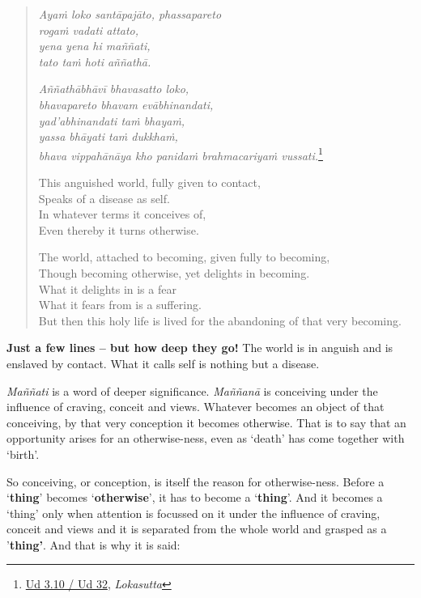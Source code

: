 \enlargethispage{\baselineskip}

\begin{quote}
\emph{Ayaṁ loko santāpajāto, phassapareto}\\
\emph{rogaṁ vadati attato,}\\
\emph{yena yena hi maññati,}\\
\emph{tato taṁ hoti aññathā.}

\emph{Aññathābhāvī bhavasatto loko,}\\
\emph{bhavapareto bhavam evābhinandati,}\\
\emph{yad'abhinandati taṁ bhayaṁ,}\\
\emph{yassa bhāyati taṁ dukkhaṁ,}\\
\emph{bhava vippahānāya kho panidaṁ brahmacariyaṁ vussati.}\footnote{\href{https://suttacentral.net/ud3.10/pli/ms}{Ud 3.10 / Ud 32}, \emph{Lokasutta}}

This anguished world, fully given to contact,\\
Speaks of a disease as self.\\
In whatever terms it conceives of,\\
Even thereby it turns otherwise.

The world, attached to becoming, given fully to becoming,\\
Though becoming otherwise, yet delights in becoming.\\
What it delights in is a fear\\
What it fears from is a suffering.\\
But then this holy life is lived for the abandoning of that very becoming.
\end{quote}

\textbf{Just a few lines -- but how deep they go!} The world is in anguish and is enslaved by contact. What it calls self is nothing but a disease.

\emph{Maññati} is a word of deeper significance. \emph{Maññanā} is conceiving under the influence of craving, conceit and views. Whatever becomes an object of that conceiving, by that very conception it becomes otherwise. That is to say that an opportunity arises for an otherwise-ness, even as `death' has come together with `birth'.

So conceiving, or conception, is itself the reason for otherwise-ness. Before a `\textbf{thing}' becomes `\textbf{otherwise}', it has to become a `\textbf{thing}'. And it becomes a `thing' only when attention is focussed on it under the influence of craving, conceit and views and it is separated from the whole world and grasped as a '\textbf{thing'}. And that is why it is said:

